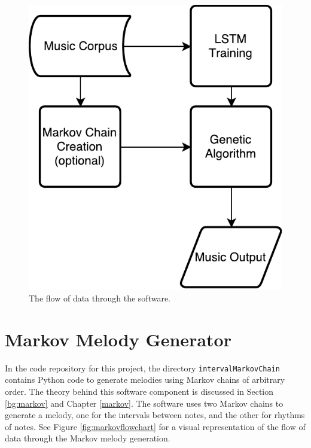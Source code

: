 \begin{figure}[h]
	\centering
	\includegraphics{figures/overview_flowchart.pdf}
	\caption{The flow of data through the software.}
	\label{fig:softwareoverview}
\end{figure}

\section{Markov Melody Generator} \label{software:markov}

In the code repository for this project, the directory \texttt{intervalMarkovChain} contains Python code to generate melodies using Markov chains of arbitrary order.
The theory behind this software component is discussed in Section \ref{bg:markov} and Chapter \ref{markov}.
The software uses two Markov chains to generate a melody, one for the intervals between notes, and the other for rhythms of notes.
See Figure \ref{fig:markovflowchart} for a visual representation of the flow of data through the Markov melody generation.

